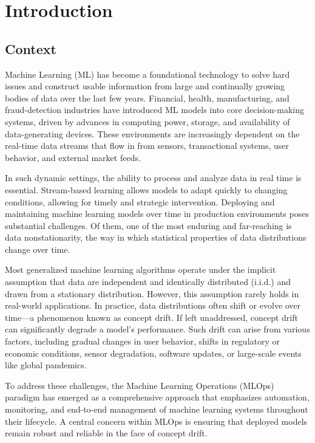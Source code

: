 \chapter{Introduction}\label{ch:introduction}

\section{Context}\label{sec:context}
Machine Learning (ML) has become a foundational technology to solve hard issues
and construct usable information from large and continually growing bodies of
data over the last few years. Financial, health, manufacturing, and
fraud-detection industries have introduced ML models into core decision-making
systems, driven by advances in computing power, storage, and availability of
data-generating devices. These environments are increasingly dependent on the
real-time data streams that flow in from sensors, transactional systems, user
behavior, and external market feeds.

In such dynamic settings, the ability to process and analyze data in real time
is essential. Stream-based learning allows models to adapt quickly to changing
conditions, allowing for timely and strategic intervention. Deploying and
maintaining machine learning models over time in production environments poses
substantial challenges. Of them, one of the most enduring and far-reaching is
data nonstationarity, the way in which statistical properties of data
distributions change over time.

Most generalized machine learning algorithms operate under the implicit
assumption that data are independent and identically distributed (i.i.d.) and
drawn from a stationary distribution. However, this assumption rarely holds in
real-world applications. In practice, data distributions often shift or evolve
over time—a phenomenon known as concept drift. If left unaddressed, concept
drift can significantly degrade a model's performance. Such drift can arise
from various factors, including gradual changes in user behavior, shifts in
regulatory or economic conditions, sensor degradation, software updates, or
large-scale events like global pandemics.

To address these challenges, the Machine Learning Operations (MLOps) paradigm
has emerged as a comprehensive approach that emphasizes automation, monitoring,
and end-to-end management of machine learning systems throughout their
lifecycle. A central concern within MLOps is ensuring that deployed models
remain robust and reliable in the face of concept drift.

